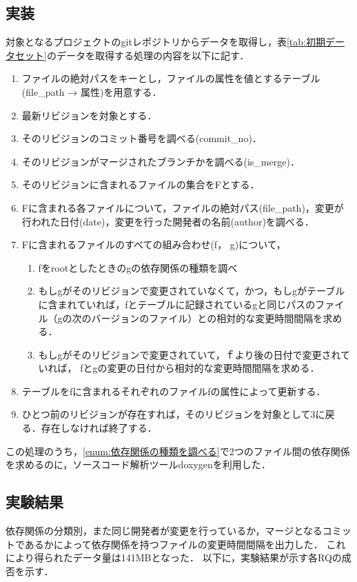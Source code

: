 \documentclass{fose2016}           %
\begin{document}
\subsection{実装}
対象となるプロジェクトのgitレポジトリからデータを取得し，表\ref{tab:初期データセット}のデータを取得する処理の内容を以下に記す．
\begin{enumerate}
\item ファイルの絶対パスをキーとし，ファイルの属性を値とするテーブル(file\_path → 属性)を用意する．
\item 最新リビジョンを対象とする．
\item そのリビジョンのコミット番号を調べる(commit\_no)．
\item そのリビジョンがマージされたブランチかを調べる(is\_merge)．
\item そのリビジョンに含まれるファイルの集合をFとする．
\item Fに含まれる各ファイルについて，ファイルの絶対パス(file\_path)，変更が行われた日付(date)，変更を行った開発者の名前(author)を調べる．
\item Fに含まれるファイルのすべての組み合わせ(f， g)について，
\begin{enumerate}
\item fをrootとしたときのgの依存関係の種類を調べ\label{enum:依存関係の種類を調べる}
\item もしgがそのリビジョンで変更されていなくて，かつ，もしgがテーブルに含まれていれば，fとテーブルに記録されているgと同じパスのファイル（gの次のバージョンのファイル）との相対的な変更時間間隔を求める．
\item  もしgがそのリビジョンで変更されていて，ｆより後の日付で変更されていれば， fとgの変更の日付から相対的な変更時間間隔を求める．
\end{enumerate}
\item テーブルをfに含まれるそれぞれのファイルfの属性によって更新する．
\item ひとつ前のリビジョンが存在すれば，そのリビジョンを対象として3に戻る．存在しなければ終了する．
\end{enumerate}

この処理のうち，\ref{enum:依存関係の種類を調べる}で2つのファイル間の依存関係を求めるのに，ソースコード解析ツールdoxygenを利用した．

\subsection{実験結果}
依存関係の分類別，また同じ開発者が変更を行っているか，マージとなるコミットであるかによって依存関係を持つファイルの変更時間間隔を出力した．
これにより得られたデータ量は141MBとなった．
以下に，実験結果が示す各RQの成否を示す．
\end{document}
